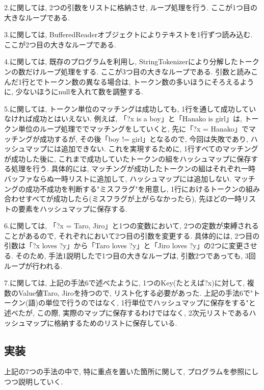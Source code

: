 \documentclass[12pt]{jarticle}
\begin{document}
2.に関しては, 2つの引数をリストに格納させ, ループ処理を行う. ここが1つ目の大きなループである.

3.に関しては, BufferedReaderオブジェクトによりテキストを1行ずつ読み込む. ここが2つ目の大きなループである.

4.に関しては, 既存のプログラムを利用し, StringTokenizerにより分解したトークンの数だけループ処理をする. ここが3つ目の大きなループである. 引数と読みこんだ1行とでトークン数の異なる場合は, トークン数の多いほうにそろえるように, 少ないほうにnullを入れて数を調整する.

5.に関しては, トークン単位のマッチングは成功しても, 1行を通して成功していなければ成功とはいえない. 例えば, 「?x is a boy」と「Hanako is girl」は, トークン単位のループ処理ででマッチングをしていくと, 先に「?x = Hanako」でマッチングが成功するが, その後「boy != girl」となるので, 今回は失敗であり, ハッシュマップには追加できない. これを実現するために, 1行すべてのマッチングが成功した後に, これまで成功していたトークンの組をハッシュマップに保存する処理を行う. 具体的には, マッチングが成功したトークンの組はそれぞれ一時バッファならぬ一時リストに追加して, ハッシュマップには追加しない. マッチングの成功不成功を判断する"ミスフラグ"を用意し, 1行におけるトークンの組み合わせすべてが成功したら(ミスフラグが上がらなかったら), 先ほどの一時リストの要素をハッシュマップに保存する.

6.に関しては, 「?x = Taro, Jiro」と1つの変数において, 2つの定数が束縛されることがあるので, それぞれにおいて2つ目の引数を変更する. 具体的には, 2つ目の引数は「?x loves ?y」から「Taro loves ?y」と「Jiro loves ?y」の2つに変更させる. そのため, 手法1説明したで1つ目の大きなループは, 引数2つであっても, 3回ループが行われる.

7.に関しては, 上記の手法6で述べたように, 1つのKey(たとえば?x)に対して, 複数のValue値{Taro, Jiro}を持つので, リスト化する必要があった. 上記の手法6で"トークン(語)の単位で行うのではなく, 1行単位でハッシュマップに保存をする"と述べたが, この際, 実際のマップに保存するわけではなく, 2次元リストであるハッシュマップに格納するためのリストに保存している.

\subsection{実装}
上記の7つの手法の中で, 特に重点を置いた箇所に関して, プログラムを参照にしつつ説明していく.
\end{document}
